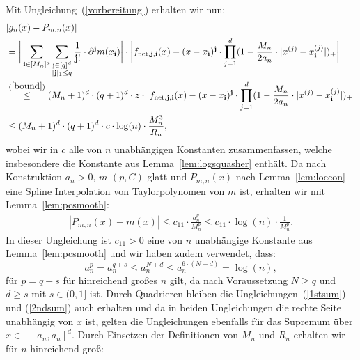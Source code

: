  Mit Ungleichung~(\ref{vorbereitung}) erhalten wir nun:
\begin{equation}
\label{1stsum}
\begin{split}
& |g_n(x) - P_{m,n}(x)| \\
& = \bigg| \sum_{\mathbf{i} \in [M_n]^d} \sum_{\substack{ \mathbf{j} \in [q]^d \\ |\mathbf{j}|_1 \leq q}} \frac{1}{\mathbf{j}!} \cdot \partial^{\mathbf{j}} m (x_{\mathbf{i}}) \bigg| \cdot \bigg| f_{\mathrm{net},\mathbf{j},\mathbf{i}}(x) - (x - x_{\mathbf{i}})^{\mathbf{j}} \cdot \prod_{j = 1}^d(1 - \frac{M_n}{2a_n} \cdot |x^{(j)} - x_{\mathbf{i}}^{(j)}|)_+ \bigg| \\
& \stackrel{(\ref{bound})}{\leq} (M_n + 1)^d \cdot (q + 1)^d \cdot z \cdot \bigg| f_{\mathrm{net},\mathbf{j},\mathbf{i}}(x) - (x - x_{\mathbf{i}})^{\mathbf{j}} \cdot \prod_{j = 1}^d(1 - \frac{M_n}{2a_n} \cdot |x^{(j)} - x_{\mathbf{i}}^{(j)}|)_+ \bigg| \\
& \leq  (M_n + 1)^d \cdot (q + 1)^d \cdot c\cdot \log(n) \cdot \frac{M_n^3}{R_n},
\end{split}
\end{equation}
wobei wir in $c$ alle von $n$ unabhängigen Konstanten zusammenfassen, welche insbesondere die Konstante aus Lemma~\ref{lem:logsquasher} enthält.
Da nach Konstruktion $a_n > 0$, $m$ $(p, C)$-glatt und $P_{m,n}(x)$ nach Lemma~\ref{lem:loccon} eine Spline Interpolation von Taylorpolynomen von $m$ ist, erhalten wir mit Lemma~\ref{lem:pcsmooth}:
\begin{equation}
\label{2ndsum}
\begin{split}
|P_{m,n}(x) - m(x)| \leq c_{11} \cdot \frac{a_n^p}{M_n^p} \leq c_{11} \cdot \log(n) \cdot \frac{1}{M_n^p}.
\end{split}
\end{equation}
In dieser Ungleichung ist $c_{11} > 0$ eine von $n$ unabhängige Konstante aus Lemma~\ref{lem:pcsmooth} und wir haben zudem verwendet, dass:
$$a_n^p = a_n^{q + s} \leq a_n^{N + d} \leq a_n^{6 \cdot (N + d)} = \log(n),$$
für $p = q + s$ für hinreichend großes $n$ gilt, da nach Voraussetzung $N \geq q$ und $d \geq s$ mit $s \in (0, 1]$ ist.
Durch Quadrieren bleiben die Ungleichungen~(\ref{1stsum}) und (\ref{2ndsum}) auch erhalten und da in beiden Ungleichungen die rechte Seite unabhängig von $x$ ist, gelten die Ungleichungen ebenfalls für das Supremum über $x \in [-a_n,a_n]^d$. Durch Einsetzen der Definitionen von $M_n$ und $R_n$ erhalten wir für $n$ hinreichend groß:
